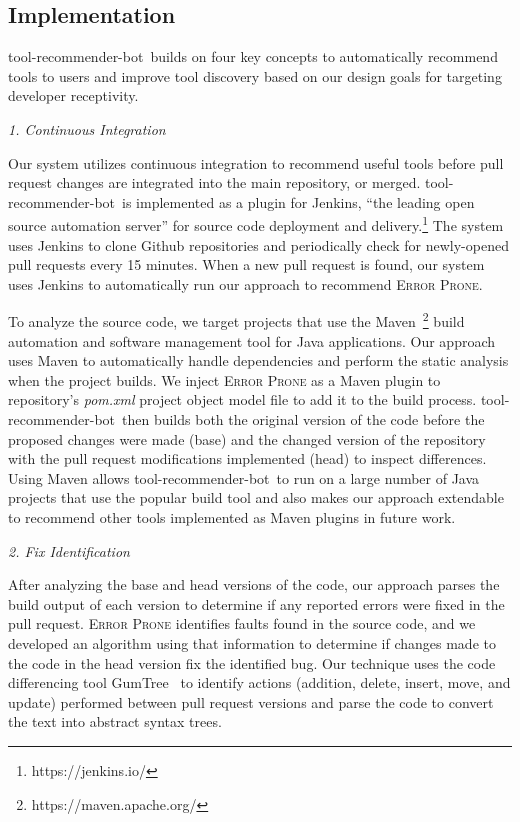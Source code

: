 \documentclass[conference]{IEEEtran}
\newcommand{\tool}{tool-recommender-bot}
\newcommand{\pseudosubsection}[1]{\vspace{2mm} {\it #1}}
\begin{document}
\subsection{Implementation}

\tool~builds on four key concepts to automatically recommend tools to users and improve tool discovery based on our design goals for targeting developer receptivity.

\pseudosubsection{1. Continuous Integration}

Our system utilizes continuous integration to recommend useful tools before pull request changes are integrated into the main repository, or merged. \tool~is implemented as a plugin for Jenkins, ``the leading open source automation server'' for source code deployment and delivery.\footnote{https://jenkins.io/} The system uses Jenkins to clone Github repositories and periodically check for newly-opened pull requests every 15 minutes. When a new pull request is found, our system uses Jenkins to automatically run our approach to recommend \textsc{Error Prone}.

To analyze the source code, we target projects that use the Maven~\footnote{https://maven.apache.org/} build automation and software management tool for Java applications. Our approach uses Maven to automatically handle dependencies and perform the static analysis when the project builds. We inject \textsc{Error Prone} as a Maven plugin to repository's \textit{pom.xml} project object model file to add it to the build process. \tool~then builds both the original version of the code before the proposed changes were made (base) and the changed version of the repository with the pull request modifications implemented (head) to inspect differences. Using Maven allows \tool~to run on a large number of Java projects that use the popular build tool and also makes our approach extendable to recommend other tools implemented as Maven plugins in future work. 

\pseudosubsection{2. Fix Identification}

After analyzing the base and head versions of the code, our approach parses the build output of each version to determine if any reported errors were fixed in the pull request. \textsc{Error Prone} identifies faults found in the source code, and we developed an algorithm using that information to determine if changes made to the code in the head version fix the identified bug. Our technique uses the code differencing tool GumTree~\cite{GumTree} to identify actions (addition, delete, insert, move, and update) performed between pull request versions and parse the code to convert the text into abstract syntax trees. 
\end{document}

